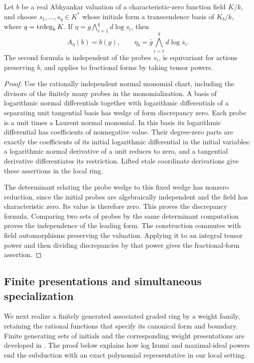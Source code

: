 \begin{lemma}\label{a:leading-form}
Let \(b\) be a real Abhyankar valuation of a characteristic-zero function
field \(K/k\), and choose \(s_1,\ldots,s_q\in K^*\) whose initials form
a transcendence basis of \(K_b/k\), where \(q=\operatorname{trdeg}_k K\).
If \(\eta=g\bigwedge_{i=1}^q d\log s_i\), then
\begin{equation}
 A_\eta(b)=b(g),\qquad
 \eta_b=\bar g\bigwedge_{i=1}^q d\log\bar s_i.
 \label{eq:A6}
\end{equation}
The second formula is independent of the probes \(s_i\), is equivariant
for actions preserving \(b\), and applies to fractional forms by taking
tensor powers.
\end{lemma}

\begin{proof}
Use the rationally independent normal monomial chart, including the
divisors of the finitely many probes in the monomialization. A basis of
logarithmic normal differentials together with logarithmic differentials
of a separating unit tangential basis has wedge of form discrepancy
zero. Each probe is a unit times a Laurent normal monomial. In this
basis its logarithmic differential has coefficients of nonnegative
value. Their degree-zero parts are exactly the coefficients of its
initial logarithmic differential in the initial variables: a logarithmic
normal derivative of a unit reduces to zero, and a tangential derivative
differentiates its restriction. Lifted etale coordinate derivations give
these assertions in the local ring.

The determinant relating the probe wedge to this fixed wedge has
nonzero reduction, since the initial probes are algebraically
independent and the field has characteristic zero. Its value is
therefore zero. This proves the discrepancy formula. Comparing two
sets of probes by the same determinant computation proves the
independence of the leading form. The construction commutes with field
automorphisms preserving the valuation. Applying it to an integral
tensor power and then dividing discrepancies by that power gives the
fractional-form assertion.
\end{proof}

\subsection{Finite presentations and simultaneous specialization}

We next realize a finitely generated associated graded ring by a weight
family, retaining the rational functions that specify its canonical form
and boundary. Finite generating sets of initials and the corresponding
weight presentations are developed in
\cite[Theorem~2.17, Lemmas~3.2 and~3.4, and Section~3.3]{KavehManon}.
The proof below explains how log Izumi and maximal-ideal powers end the
subduction with an exact polynomial representative in our local setting.

